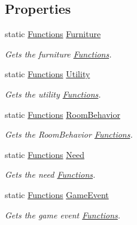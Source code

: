 \subsection*{Properties}
\begin{DoxyCompactItemize}
\item 
static \hyperlink{class_functions}{Functions} \hyperlink{class_functions_manager_aa43476bd866ef89560ae46cd7fd9d53d}{Furniture}
\begin{DoxyCompactList}\small\item\em Gets the furniture \hyperlink{class_functions}{Functions}. \end{DoxyCompactList}\item 
static \hyperlink{class_functions}{Functions} \hyperlink{class_functions_manager_af3ecee4c8c9b81690a58ee7f41fe6de1}{Utility}
\begin{DoxyCompactList}\small\item\em Gets the utility \hyperlink{class_functions}{Functions}. \end{DoxyCompactList}\item 
static \hyperlink{class_functions}{Functions} \hyperlink{class_functions_manager_a2dacbb45933b4d46a50f28493e583f49}{Room\+Behavior}
\begin{DoxyCompactList}\small\item\em Gets the Room\+Behavior \hyperlink{class_functions}{Functions}. \end{DoxyCompactList}\item 
static \hyperlink{class_functions}{Functions} \hyperlink{class_functions_manager_abe4e76cc6cb819da231ba52ba559972d}{Need}
\begin{DoxyCompactList}\small\item\em Gets the need \hyperlink{class_functions}{Functions}. \end{DoxyCompactList}\item 
static \hyperlink{class_functions}{Functions} \hyperlink{class_functions_manager_a4644c25bbcf8f5c115db158619b66247}{Game\+Event}
\begin{DoxyCompactList}\small\item\em Gets the game event \hyperlink{class_functions}{Functions}. \end{DoxyCompactList}\item 

\end{DoxyCompactItemize}
